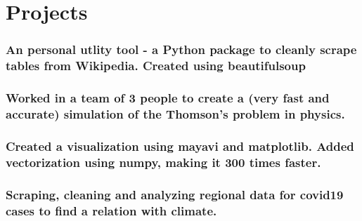 \documentclass[a4paper]{resume}
\begin{document}
\section{Projects}
\subsubsection{An personal utlity tool - a Python package to cleanly scrape tables from Wikipedia. Created using beautifulsoup}

\subsubsection{Worked in a team of 3 people to create a (very fast and accurate) simulation of the Thomson's problem in physics.}
\subsubsection{Created a visualization using mayavi and matplotlib. Added vectorization using numpy, making it 300 times faster.}

\subsubsection{Scraping, cleaning and analyzing regional data for covid19 cases to find a relation with climate.}
\end{document}
